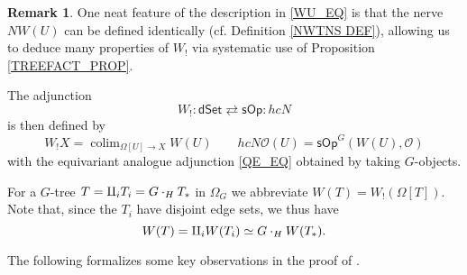 \documentclass[a4paper,10pt
,draft
]{article}%
\numberwithin{equation}{section}
\numberwithin{figure}{section}
\theoremstyle{definition} %
\newtheorem{remark}[equation]{Remark}%
\newcommand{\sOp}{\ensuremath{\mathsf{sOp}}}%
\newcommand{\dSet}{\mathsf{dSet}}
\DeclareMathOperator{\colim}{colim}%
\renewcommand{\O}{\ensuremath{\mathcal O}}
\newcommand{\1}{\ensuremath{\mathbbm 1}}%
\begin{document}
\begin{remark}
	One neat feature of the description in 
	\eqref{WU_EQ}
	is that the nerve $N W(U)$
	can be defined identically 
	(cf. Definition \ref{NWTNS DEF}),
	allowing us to deduce many properties of $W_!$
	via systematic use of 
	Proposition \ref{TREEFACT_PROP}.
\end{remark}



The adjunction
\begin{equation} \label{SOPDSET_EQ}
	W_! \colon \dSet \rightleftarrows \sOp \colon h c N           
\end{equation}
is then defined by
\[
	W_!X = \colim_{\Omega[U] \to X}W(U)
	\qquad
	hcN\O(U) = \sOp^G(W(U), \O)
\]
with the equivariant analogue adjunction \eqref{QE_EQ}
obtained by taking $G$-objects.


For a $G$-tree 
$T = \amalg_i T_i = G \cdot_H T_{\**}$
in $\Omega_G$
we abbreviate
$W(T) = W_!(\Omega[T])$.
Note that, since the $T_i$ have disjoint edge sets, we thus have
\[
	W(T) = \amalg_i W(T_i) \simeq G \cdot_H W(T_{\**}).
\]


The following formalizes some key observations in the proof of
\cite[Prop. 4.5]{CM13b}.
\end{document}
